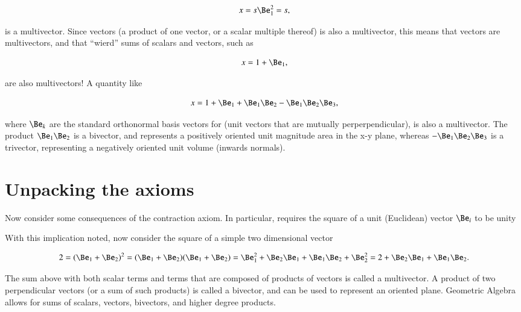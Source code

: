 \begin{equation}\label{eqn:multivector:20}
   x = s \Be_1^2 = s,
\end{equation}

is a multivector.  Since vectors (a product of one vector, or a scalar multiple thereof) is also a multivector, this
means that vectors are multivectors, and that ``wierd'' sums of scalars and vectors, such as

\begin{dmath}\label{eqn:multivector:40}
   x = 1 + \Be_1,
\end{dmath}

are also multivectors!  A quantity like

\begin{dmath}\label{eqn:multivector:45}
   x = 1 + \Be_1 + \Be_1 \Be_2 - \Be_1 \Be_2 \Be_3,
\end{dmath}

where \( \Be_k \) are the standard orthonormal basis vectors for  (unit vectors that are mutually perperpendicular), is also a multivector.  The product \( \Be_1 \Be_2 \) is a bivector, and represents a positively oriented unit magnitude area in the x-y plane, whereas \( - \Be_1 \Be_2 \Be_3 \) is a trivector, representing a negatively oriented unit volume (inwards normals).

\section{Unpacking the axioms}
Now consider some consequences of the contraction axiom.  In particular,
requires the square of a unit (Euclidean) vector \( \Be_i \) to be unity


With this implication noted, now consider the square of a simple two dimensional vector

\begin{dmath}\label{eqn:gaTutorial:80}
2
=
(\Be_1 + \Be_2)^2
= (\Be_1 + \Be_2)(\Be_1 + \Be_2)
= \Be_1^2 + \Be_2 \Be_1 + \Be_1 \Be_2 + \Be_2^2
= 2 + \Be_2 \Be_1 + \Be_1 \Be_2.
\end{dmath}

The sum above with both scalar terms and terms that are composed of products of vectors is called a multivector.
A product of two perpendicular vectors (or a sum of such products) is called a bivector, and can be used to represent an oriented plane.
Geometric Algebra allows for sums of scalars, vectors, bivectors, and higher degree products.

